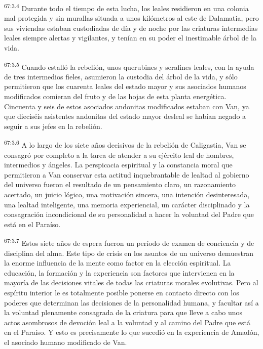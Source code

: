 \par
\textsuperscript{67:3.4} Durante todo el tiempo de esta lucha, los leales residieron en una colonia mal protegida y sin murallas situada a unos kilómetros al este de Dalamatia, pero sus viviendas estaban custodiadas de día y de noche por las criaturas intermedias leales siempre alertas y vigilantes, y tenían en su poder el inestimable árbol de la vida.

\par
\textsuperscript{67:3.5} Cuando estalló la rebelión, unos querubines y serafines leales, con la ayuda de tres intermedios fieles, asumieron la custodia del árbol de la vida, y sólo permitieron que los cuarenta leales del estado mayor y sus asociados humanos modificados comieran del fruto y de las hojas de esta planta energética. Cincuenta y seis de estos asociados andonitas modificados estaban con Van, ya que dieciséis asistentes andonitas del estado mayor desleal se habían negado a seguir a sus jefes en la rebelión.

\par
\textsuperscript{67:3.6} A lo largo de los siete años decisivos de la rebelión de Caligastia, Van se consagró por completo a la tarea de atender a su ejército leal de hombres, intermedios y ángeles. La perspicacia espiritual y la constancia moral que permitieron a Van conservar esta actitud inquebrantable de lealtad al gobierno del universo fueron el resultado de un pensamiento claro, un razonamiento acertado, un juicio lógico, una motivación sincera, una intención desinteresada, una lealtad inteligente, una memoria experiencial, un carácter disciplinado y la consagración incondicional de su personalidad a hacer la voluntad del Padre que está en el Paraíso.

\par
\textsuperscript{67:3.7} Estos siete años de espera fueron un período de examen de conciencia y de disciplina del alma. Este tipo de crisis en los asuntos de un universo demuestran la enorme influencia de la mente como factor en la elección espiritual. La educación, la formación y la experiencia son factores que intervienen en la mayoría de las decisiones vitales de todas las criaturas morales evolutivas. Pero al espíritu interior le es totalmente posible ponerse en contacto directo con los poderes que determinan las decisiones de la personalidad humana, y facultar así a la voluntad plenamente consagrada de la criatura para que lleve a cabo unos actos asombrosos de devoción leal a la voluntad y al camino del Padre que está en el Paraíso. Y esto es precisamente lo que sucedió en la experiencia de Amadón, el asociado humano modificado de Van.

